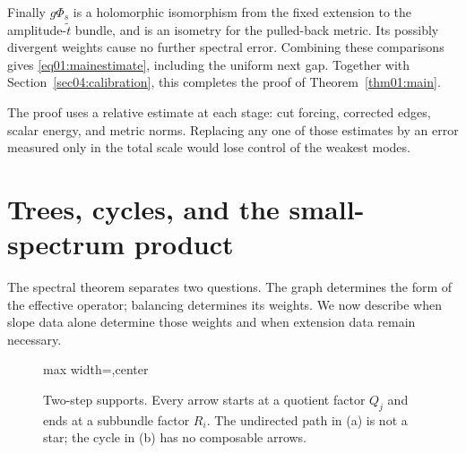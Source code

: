 \documentclass[11pt]{amsart}
\theoremstyle{definition}
\theoremstyle{remark}
\begin{document}
Finally \(g\Phi_s\) is a holomorphic isomorphism from the fixed
extension to the amplitude-\(\widetilde t\) bundle, and is an
isometry for the pulled-back metric. Its possibly divergent
weights cause no further spectral error.
Combining these comparisons gives
\eqref{eq01:mainestimate}, including the uniform next gap.
Together with Section~\ref{sec04:calibration}, this completes
the proof of Theorem~\ref{thm01:main}.

The proof uses a relative estimate at each stage: cut forcing,
corrected edges, scalar energy, and metric norms. Replacing any
one of those estimates by an error measured only in the total
scale would lose control of the weakest modes.

\section{Trees, cycles, and the small-spectrum product}
\label{sec06:consequences}

The spectral theorem separates two questions. The graph determines
the form of the effective operator; balancing determines its weights.
We now describe when slope data alone determine those weights and
when extension data remain necessary.

\begin{figure}[ht]
\centering
\begin{adjustbox}{max width=\textwidth,center}
\end{adjustbox}
\caption{Two-step supports. Every arrow starts at a quotient factor
\(Q_j\) and ends at a subbundle factor \(R_i\).
The undirected path in (a) is not a star; the cycle in (b) has
no composable arrows.}
\label{fig06:supports}
\end{figure}
\end{document}
